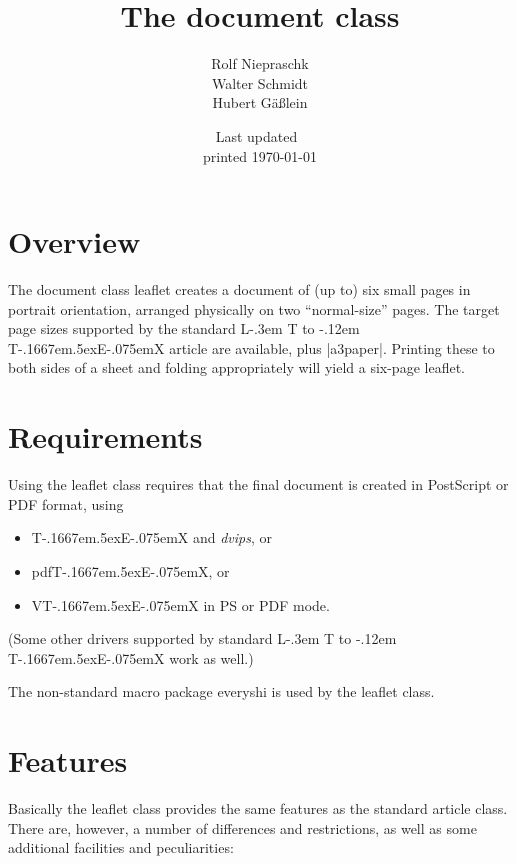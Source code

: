 \documentclass[
]{leaflet}
\title{The document class \Lclass{leaflet}}
\author{%
  Rolf Niepraschk\\
  Walter Schmidt\\
  Hubert G\"a\ss lein}
\date{Last updated~\docdate\\printed \today}
\makeatletter
\def\ptmTeX{T\kern-.1667em\lower.5ex\hbox{E}\kern-.075emX\@}
\DeclareRobustCommand{\ptmLaTeX}{L\kern-.3em
        {\setbox0\hbox{T}%
         \vbox to\ht0{\hbox{%
                            \csname S@\f@size\endcsname
                            \fontsize\sf@size\z@
                            \math@fontsfalse\selectfont
                            A}%
                      \vss}%
        }%
        \kern-.12em
        \ptmTeX}
\let\TeX=\ptmTeX
\let\LaTeX=\ptmLaTeX
\newcommand\Lpack[1]{\textsf{#1}}
\newcommand\Lclass[1]{\textsf{#1}}
\newcommand\Lprog[1]{\textit{#1}}
\makeatother
\begin{document}
\maketitle
\thispagestyle{empty}



\section{Overview}

The document class \Lclass{leaflet} creates a document of (up to) six
small pages in portrait orientation, arranged physically on two
``normal-size'' pages. The target page sizes supported by the standard
\LaTeX{}  \Lclass{article} are available, plus |a3paper|. Printing these
to both sides of a sheet and folding appropriately will yield a six-page
leaflet.

\iffalse
\reversemarginpar
\marginpar[XXX]{YYY}
\fi
\onecolumn
\twocolumn[WWW]

\section{Requirements}

Using the \Lclass{leaflet} class requires that the final
document is created in PostScript or PDF format, using
\begin{itemize}
  \item \TeX{} and \Lprog{dvips}, or
  \item pdf\TeX{}, or
  \item V\TeX{} in PS or PDF mode.
\end{itemize}
(Some other drivers supported by standard \LaTeX{} work as well.)

The non-standard macro package \Lpack{everyshi} \cite{cit:everyshi} is
used by the \Lclass{leaflet} class.

\section{Features}

Basically the \Lclass{leaflet} class provides the same features as the
standard \Lclass{article} class. There are, however, a number of
differences and restrictions, as well as some additional facilities and
peculiarities:
\end{document}
